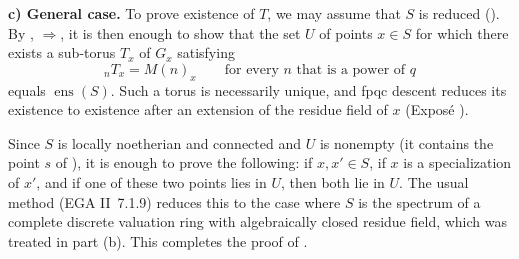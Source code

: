 \medskip\noindent
\textbf{c) General case.}
To prove existence of \(T\), we may assume that \(S\) is reduced
(). By , \(\Rightarrow\), it is then
enough to show that the set \(U\) of points \(x\in S\) for which there
exists a sub-torus \(T_x\) of \(G_x\) satisfying
\[
  {}_nT_x=M(n)_x
  \qquad\text{for every }n\text{ that is a power of }q
\]
equals \(\operatorname{ens}(S)\). Such a torus is necessarily unique,
and fpqc descent reduces its existence to existence after an extension
of the residue field of \(x\) (Exposé ).

Since \(S\) is locally noetherian and connected and \(U\) is nonempty
(it contains the point \(s\) of ), it is enough to prove
the following: if \(x,x'\in S\), if \(x\) is a specialization of
\(x'\), and if one of these two points lies in \(U\), then both lie
in \(U\). The usual method (EGA II~7.1.9) reduces this to the case
where \(S\) is the spectrum of a complete discrete valuation ring
with algebraically closed residue field, which was treated in part
(b). This completes the proof of .

